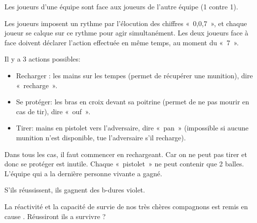 \documentclass{grand-jeu}
\begin{document}
\begin{regles}
Les joueurs d'une équipe sont face aux joueurs de l'autre équipe (1 contre 1). 

Les joueurs imposent un rythme par l'élocution des chiffres « 0,0,7 », et chaque joueur se calque sur ce rythme pour agir simultanément. Les deux joueurs face à face doivent déclarer l'action effectuée en même temps, au moment du « 7 ». 

\vspace{0.2cm}
Il y a 3 actions possibles: 
\begin{itemize}
  \item Recharger : les mains sur les tempes (permet de récupérer une munition), dire « recharge ».
  \item Se protéger: les bras en croix devant sa poitrine (permet de ne pas mourir en cas de tir), dire « ouf ». 
  \item Tirer: mains en pistolet vers l'adversaire, dire « pan » (impossible si aucune munition n'est disponible, tue l'adversaire s'il recharge).
\end{itemize}

Dans tous les cas, il faut commencer en rechargeant. Car on ne peut pas tirer et donc se protéger est inutile. Chaque « pistolet » ne peut contenir que 2 balles. L’équipe qui a la dernière personne vivante a gagné.

S’ils réussissent, ils gagnent des b-dures violet.
\end{regles}

\begin{imaginaire}

La réactivité et la capacité de survie de nos très chères compagnons est remis en cause . Réussiront ils a survivre ?
\end{imaginaire}

\begin{moments-stop}
\end{moments-stop}
\end{document}
